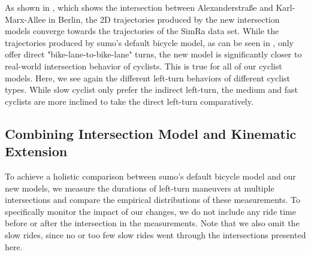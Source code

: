 As shown in , which shows the intersection between Alexanderstraße and Karl-Marx-Allee in Berlin, the 2D trajectories produced by the new intersection models converge towards the trajectories of the SimRa data set.
While the trajectories produced by \ac{sumo}'s default bicycle model, as can be seen in , only offer direct "bike-lane-to-bike-lane" turns, the new model is significantly closer to real-world intersection behavior of cyclists.
This is true for all of our cyclist models.
Here, we see again the different left-turn behaviors of different cyclist types.
While slow cyclist only prefer the indirect left-turn, the medium and fast cyclists are more inclined to take the direct left-turn comparatively.

\subsection{Combining Intersection Model and Kinematic Extension}
\label{subsec:combinin_intersection_model_and_kinematic_extension}
To achieve a holistic comparison between \ac{sumo}'s default bicycle model and our new models, we measure the durations of left-turn maneuvers at multiple intersections and compare the empirical distributions of these measurements.
To specifically monitor the impact of our changes, we do not include any ride time before or after the intersection in the measurements.
Note that we also omit the slow rides, since no or too few slow rides went through the intersections presented here.

